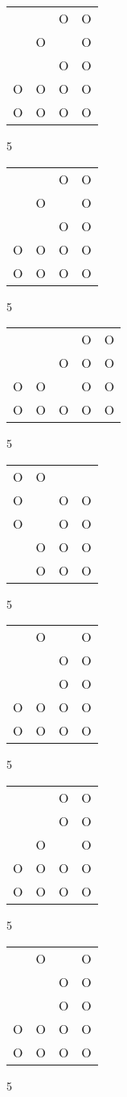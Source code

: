 \begin{tabular}{|m{0.2cm}m{0.2cm}m{0.2cm}m{0.2cm}|}\hline
 & &O&O\\
 &O& &O\\
 & &O&O\\
O&O&O&O\\
O&O&O&O\\
\hline\end{tabular}5
\begin{tabular}{|m{0.2cm}m{0.2cm}m{0.2cm}m{0.2cm}|}\hline
 & &O&O\\
 &O& &O\\
 & &O&O\\
O&O&O&O\\
O&O&O&O\\
\hline\end{tabular}5
\begin{tabular}{|m{0.2cm}m{0.2cm}m{0.2cm}m{0.2cm}m{0.2cm}|}\hline
 & & &O&O\\
 & &O&O&O\\
O&O& &O&O\\
O&O&O&O&O\\
\hline\end{tabular}5
\begin{tabular}{|m{0.2cm}m{0.2cm}m{0.2cm}m{0.2cm}|}\hline
O&O& & \\
O& &O&O\\
O& &O&O\\
 &O&O&O\\
 &O&O&O\\
\hline\end{tabular}5
\begin{tabular}{|m{0.2cm}m{0.2cm}m{0.2cm}m{0.2cm}|}\hline
 &O& &O\\
 & &O&O\\
 & &O&O\\
O&O&O&O\\
O&O&O&O\\
\hline\end{tabular}5
\begin{tabular}{|m{0.2cm}m{0.2cm}m{0.2cm}m{0.2cm}|}\hline
 & &O&O\\
 & &O&O\\
 &O& &O\\
O&O&O&O\\
O&O&O&O\\
\hline\end{tabular}5
\begin{tabular}{|m{0.2cm}m{0.2cm}m{0.2cm}m{0.2cm}|}\hline
 &O& &O\\
 & &O&O\\
 & &O&O\\
O&O&O&O\\
O&O&O&O\\
\hline\end{tabular}5
